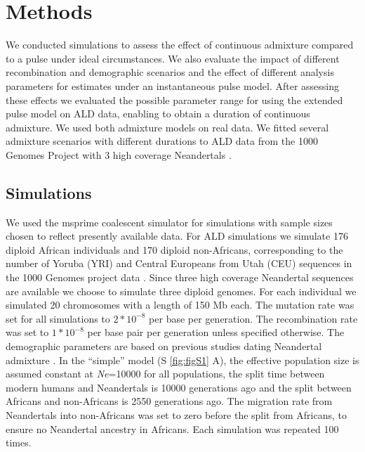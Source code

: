 \documentclass[]{article}
\begin{document}
\section{Methods}\label{methods}

We conducted simulations to assess the effect of continuous
admixture compared to a pulse under ideal circumstances. 
We also evaluate the impact of different recombination and demographic scenarios and the effect of different analysis parameters for estimates under an instantaneous pulse model.
After assessing these effects we evaluated the possible
parameter range for using the extended pulse model on ALD data,
enabling to obtain a duration of continuous admixture. We used both admixture models on real data. We fitted several admixture scenarios with different durations to ALD data from the 1000 Genomes Project \citep{the_1000_genomes_project_consortium_global_2015} with 3 high coverage Neandertals \citep{prufer_complete_2013,prufer_high-coverage_2017,mafessoni_high_coverage_2020}.

\subsection{Simulations}\label{simulations}

We used the msprime coalescent simulator
\citep{kelleher_efficient_2016} for simulations with sample sizes
chosen to reflect presently available data. For ALD simulations we simulate 176 diploid
African individuals and 170 diploid non-Africans, corresponding to the
number of Yoruba (YRI) and Central Europeans from Utah (CEU)
sequences in the 1000 Genomes project data \citep{the_1000_genomes_project_consortium_global_2015}. Since three
high coverage Neandertal sequences are available \citep{prufer_complete_2013,prufer_high-coverage_2017,mafessoni_high_coverage_2020} we choose to
simulate three diploid genomes. For each individual we simulated 20
chromosomes with a length of 150 Mb each. The mutation rate was set for
all simulations to \(2*10^{-8}\) per base per generation. The
recombination rate was set to \(1*10^{-8}\) per base pair per generation
unless specified otherwise. The demographic parameters are based on
previous studies dating Neandertal admixture
\citep{sankararaman_date_2012,fu_genome_2014,moorjani_genetic_2016}. In
the ``simple'' model (S \ref{fig:figS1} A), the effective
population size is assumed constant at \textit{Ne}=10000 for all populations, the
split time between modern humans and Neandertals is 10000 generations
ago and the split between Africans and non-Africans is 2550
generations ago. The migration rate from Neandertals into non-Africans
was set to zero before the split from Africans, to ensure no Neandertal
ancestry in Africans. Each simulation was repeated 100 times. 
\end{document}

